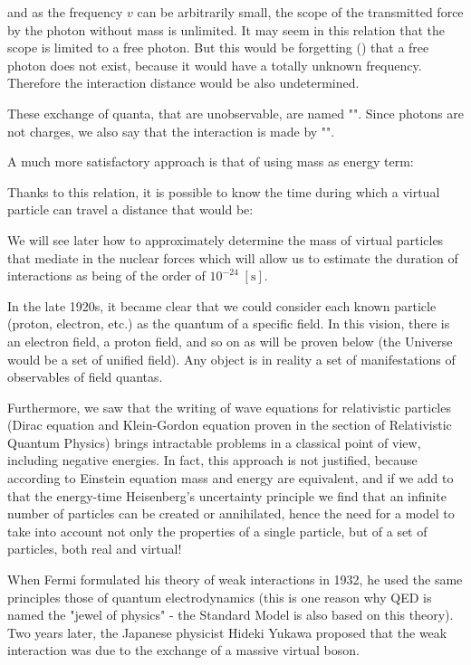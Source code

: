 	and as the frequency $v$ can be arbitrarily small, the scope of the transmitted force by the photon without mass is unlimited. It may seem in this relation that the scope is limited to a free photon. But this would be forgetting () that a free photon does not exist, because it would have a totally unknown frequency. Therefore the interaction distance would be also undetermined.
	
	These exchange of quanta, that are unobservable, are named "". Since photons are not charges, we also say that the interaction is made by "".
	
	A much more satisfactory approach is that of using mass as energy term:
	
	Thanks to this relation, it is possible to know the time during which a virtual particle can travel a distance that would be:
	
	We will see later how to approximately determine the mass of virtual particles that mediate in the nuclear forces which will allow us to estimate the duration of interactions as being of the order of $10^{-24}\; [\text{s}]$.
	
	In the late 1920s, it became clear that we could consider each known particle (proton, electron, etc.) as the quantum of a specific field. In this vision, there is an electron field, a proton field, and so on as will be proven below (the Universe would be a set of unified field). Any object is in reality a set of manifestations of observables of field quantas.
	
	Furthermore, we saw that the writing of wave equations for relativistic particles (Dirac equation and Klein-Gordon equation proven in the section of Relativistic Quantum Physics) brings intractable problems in a classical point of view, including negative energies. In fact, this approach is not justified, because according to Einstein equation mass and energy are equivalent, and if we add to that the energy-time Heisenberg's uncertainty principle we find that an infinite number of particles can be created or annihilated, hence the need for a model to take into account not only the properties of a single particle, but of a set of particles, both real and virtual!
	\begin{tcolorbox}[title=Remark,colframe=black,arc=10pt]
	When Fermi formulated his theory of weak interactions in 1932, he used the same principles those of quantum electrodynamics (this is one reason why QED is named the "jewel of physics" - the Standard Model is also based on this theory). Two years later, the Japanese physicist Hideki Yukawa proposed that the weak interaction was due to the exchange of a massive virtual boson.
	\end{tcolorbox}
	
